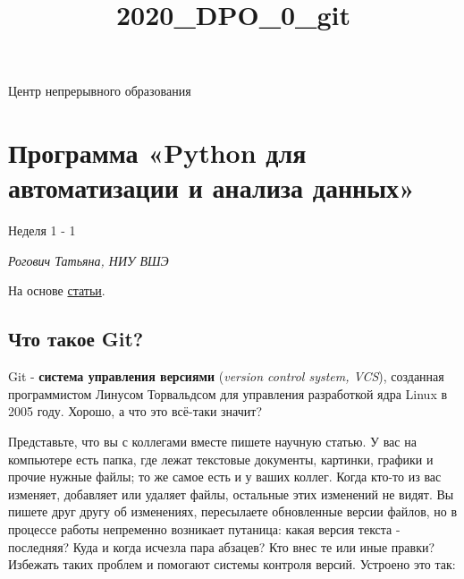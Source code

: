 \documentclass[11pt]{article}
\title{2020\_DPO\_0\_git}
\begin{document}
    
    
    \maketitle
    
    

    
    Центр непрерывного образования

\section{Программа «Python для автоматизации и анализа
данных»}\label{ux43fux440ux43eux433ux440ux430ux43cux43cux430-python-ux434ux43bux44f-ux430ux432ux442ux43eux43cux430ux442ux438ux437ux430ux446ux438ux438-ux438-ux430ux43dux430ux43bux438ux437ux430-ux434ux430ux43dux43dux44bux445}

Неделя 1 - 1

\emph{Рогович Татьяна, НИУ ВШЭ}

На основе
\href{https://ancatmara.gitbooks.io/digital-literacy/chapter1.html}{статьи}.

    \subsection{Что такое
Git?}\label{ux447ux442ux43e-ux442ux430ux43aux43eux435-git}

Git - \textbf{система управления версиями} (\emph{version control
system, VCS}), созданная программистом Линусом Торвальдсом для
управления разработкой ядра Linux в 2005 году. Хорошо, а что это
всё-таки значит?

Представьте, что вы с коллегами вместе пишете научную статью. У вас на
компьютере есть папка, где лежат текстовые документы, картинки, графики
и прочие нужные файлы; то же самое есть и у ваших коллег. Когда кто-то
из вас изменяет, добавляет или удаляет файлы, остальные этих изменений
не видят. Вы пишете друг другу об изменениях, пересылаете обновленные
версии файлов, но в процессе работы непременно возникает путаница: какая
версия текста - последняя? Куда и когда исчезла пара абзацев? Кто внес
те или иные правки? Избежать таких проблем и помогают системы контроля
версий. Устроено это так:
\end{document}
